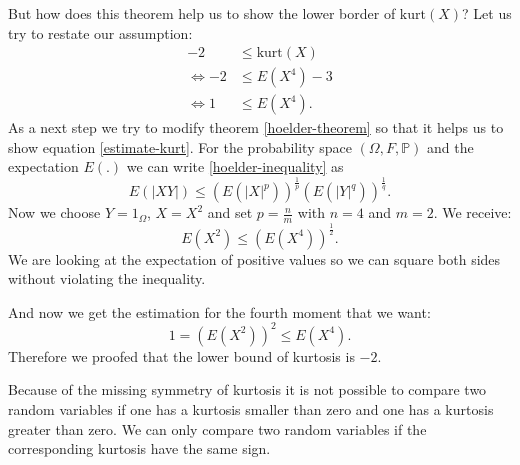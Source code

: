 \documentclass[12pt, a4paper]{article}
\numberwithin{equation}{section}
\numberwithin{figure}{section}
\numberwithin{table}{section}
\newcommand{\kurt}{\mathrm{kurt}}
\begin{document}
	But how does this theorem help us to show the lower border of \mbox{$\kurt(X)$}?
	Let us try to restate our assumption:
	\begin{equation}\label{estimate-kurt}
	\begin{split}
	-2& \leq \kurt(X) \\
	\Leftrightarrow -2 & \leq E(X^4) -3\\
	\Leftrightarrow 1 & \leq E(X^4).
	\end{split}
	\end{equation}
	As a next step we try to modify theorem \ref{hoelder-theorem} so that it helps us to show equation \ref{estimate-kurt}.
	For the probability space \mbox{$\left( \Omega, F, \mathbb{P}\right)$} and the expectation \mbox{$E(.)$} we can write \ref{hoelder-inequality} as
	\begin{equation}
	E\left(\vert XY\vert \right) \leq \left( E\left(\vert X \vert ^p \right)\right)^{\frac{1}{p}}\left( E\left(\vert Y \vert ^q \right)\right)^{\frac{1}{q}}.
	\end{equation}
	Now we choose \mbox{$Y = 1_{\Omega}$}, \mbox{$X=X^2$} and set \mbox{$p=\frac{n}{m}$} with \mbox{$n=4$} and \mbox{$m=2$}.
	We receive:
	\begin{equation}
	E(X^2) \leq \left(E\left(X^4\right)\right)^{\frac{1}{2}}.
	\end{equation}
	We are looking at the expectation of positive values so we can square both sides without violating the inequality.
	
	And now we get the estimation for the fourth moment that we want:
	\begin{equation}
	1 = \left( E(X^2) \right) ^2 \leq E\left(X^4\right).
	\end{equation}
	Therefore we proofed that the lower bound of kurtosis is $-2$.
	
	Because of the missing symmetry of kurtosis it is not possible to compare two random variables if one has a kurtosis smaller than zero and one has a kurtosis greater than zero.
	We can only compare two random variables if the corresponding kurtosis have the same sign. %
	
\end{document}
